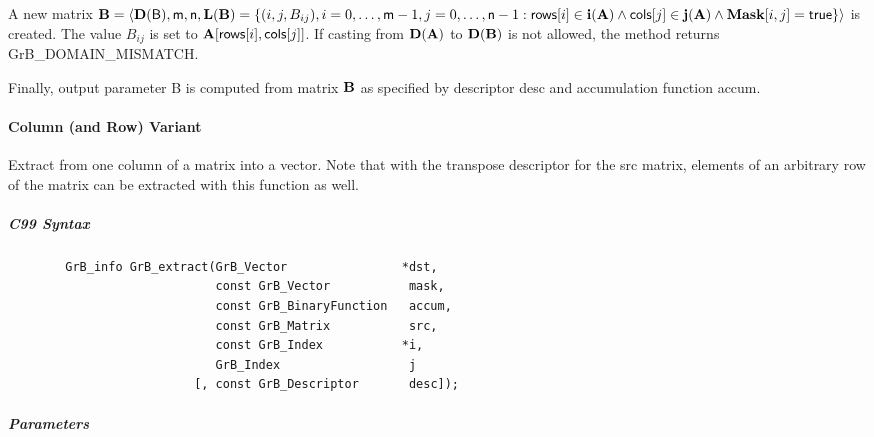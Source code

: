 A new matrix ${\bf B} = \langle \bold{D}({\sf B}),{\sf m},{\sf n},
\bold{L}({\bf B}) = \{ (i,j,B_{ij}), i = 0,\ldots,{\sf m}-1, j = 0, \ldots,{\sf n}-1 : {\sf rows}[i]
\in \bold{i}({\bf A}) \wedge {\sf cols}[j] \in \bold{j}({\bf A}) \wedge {\bf Mask}[i,j] = {\sf true} \} \rangle$
is created.  The value $B_{ij}$ is set to ${\bf A}[{\sf rows}[i],{\sf cols}[j]]$. If
casting from $\bold{D}({\bf A})$ to $\bold{D}({\bf B})$ is not
allowed, the method returns {\sf GrB\_DOMAIN\_MISMATCH}.

Finally, output parameter {\sf B} is computed from matrix ${\bf B}$ as
specified by descriptor {\sf desc} and accumulation function {\sf accum}.

\paragraph{Column (and Row) Variant}

Extract from one column of a matrix into a vector.  Note that with the transpose
descriptor for the {\sf src} matrix, elements of an arbitrary row of the matrix
can be extracted with this function as well.

\subparagraph{C99 Syntax}

\begin{verbatim}
        GrB_info GrB_extract(GrB_Vector                *dst,
                             const GrB_Vector           mask,
                             const GrB_BinaryFunction   accum,
                             const GrB_Matrix           src,
                             const GrB_Index           *i,
                             GrB_Index                  j
                          [, const GrB_Descriptor       desc]); 
\end{verbatim}

\subparagraph{Parameters}

